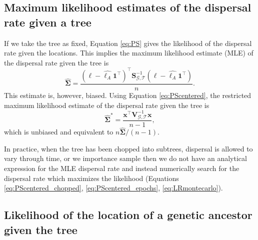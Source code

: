 \documentclass[12pt]{article}
\begin{document}
\subsection*{Maximum likelihood estimates of the dispersal rate given a tree}

If we take the tree as fixed, Equation \eqref{eq:PS} gives the likelihood of the dispersal rate given the locations. 
This implies the maximum likelihood estimate (MLE) of the dispersal rate given the tree is
%
\begin{equation}
\widehat{\mathbf{\Sigma}} = \frac{(\bm{\ell} - \widehat{\bm{\ell}_A}\mathbf{1}^\intercal)^\intercal \mathbf{S}_{\mathcal{G},\mathcal{T}}^{-1}(\bm{\ell} - \widehat{\bm{\ell}_A}\mathbf{1}^\intercal)}{n}.
\end{equation}
%
This estimate is, however, biased. Using Equation \eqref{eq:PScentered}, the restricted maximum likelihood estimate of the dispersal rate given the tree is
%
\begin{equation}\label{eq:RMLEsigma}
\widehat{\mathbf{\Sigma}}^* = \frac{\mathbf{x}^\intercal \mathbf{V}_{\mathcal{G},\mathcal{T}}^{-1}\mathbf{x}}{n-1},
\end{equation}
%
which is unbiased and equivalent to $n\widehat{\mathbf{\Sigma}}/(n-1)$.

In practice, when the tree has been chopped into subtrees, dispersal is allowed to vary through time, or we importance sample then we do not have an analytical expression for the MLE dispersal rate and instead numerically search for the dispersal rate which maximizes the likelihood (Equations \eqref{eq:PScentered_chopped}, \eqref{eq:PScentered_epochs}, \eqref{eq:LRmontecarlo}).

\subsection*{Likelihood of the location of a genetic ancestor given the tree}
\end{document}
